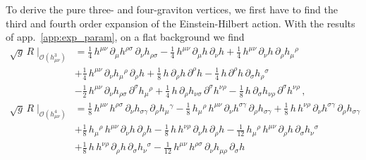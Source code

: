 \documentclass[11pt]{book}
\numberwithin{equation}{chapter}
\begin{document}
\begin{appendices}
To derive the pure three- and four-graviton vertices, we first have
to find the third and fourth order expansion of the Einstein-Hilbert
action. With the results of app.~\ref{app:exp_param},
on a flat background we find
\begin{align}
  \sqrt{g} \, R \; \Big|_{\mathcal O(h_{\mu\nu}^3)} &=
     \frac{1}{4} \, h^{\mu \nu} \, \partial_{\mu}    h^{\rho \sigma}  \, \partial_{\nu}    h_{\rho \sigma}
   - \frac{1}{4} \, h^{\mu \nu} \, \partial_{\mu}    h                \, \partial_{\nu}    h
   + \frac{1}{4} \, h^{\mu \nu} \, \partial_{\nu}    h                \, \partial_{\rho}   h_{\mu}{}^{\rho} \nonumber \\
  &+ \frac{1}{4} \, h^{\mu \nu} \, \partial_{\nu}    h_{\mu}{}^{\rho} \, \partial_{\rho}   h
   + \frac{1}{8} \, h           \, \partial_{\rho}   h                \, \partial^{\rho}   h
   - \frac{1}{4} \, h           \, \partial^{\rho}   h                \, \partial_{\sigma} h_{\rho}{}^{\sigma} \nonumber \\
  &- \frac{1}{2} \, h^{\mu \nu} \, \partial_{\nu}    h_{\rho \sigma}  \, \partial^{\sigma} h_{\mu}{}^{\rho}
   + \frac{1}{4} \, h           \, \partial_{\rho}   h_{\nu \sigma}   \, \partial^{\sigma} h^{\nu \rho}
   - \frac{1}{8} \, h           \, \partial_{\sigma} h_{\nu \rho}     \, \partial^{\sigma} h^{\nu \rho} \,, \\
   \sqrt{g} \, R \; \Big|_{\mathcal O(h_{\mu\nu}^4)} &=
     \frac{1}{8}  \, h^{\mu \nu}      \, h^{\rho \sigma} \, \partial_{\nu}    h_{\sigma \gamma}  \, \partial_{\rho}   h_{\mu}{}^{\gamma}
   - \frac{1}{8}  \, h_{\mu}{}^{\rho} \, h^{\mu \nu}     \, \partial_{\nu}    h^{\sigma \gamma}  \, \partial_{\rho}   h_{\sigma \gamma}
   + \frac{1}{8}  \, h                \, h^{\nu \rho}    \, \partial_{\nu}    h^{\sigma \gamma}  \, \partial_{\rho}   h_{\sigma \gamma} \nonumber \\
  &+ \frac{1}{8}  \, h_{\mu}{}^{\rho} \, h^{\mu \nu}     \, \partial_{\nu}    h                  \, \partial_{\rho}   h
   - \frac{1}{8}  \, h                \, h^{\nu \rho}    \, \partial_{\nu}    h                  \, \partial_{\rho}   h
   - \frac{1}{12} \, h_{\mu}{}^{\rho} \, h^{\mu \nu}     \, \partial_{\rho}   h                  \, \partial_{\sigma} h_{\nu}{}^{\sigma} \nonumber \\
  &+ \frac{1}{8}  \, h                \, h^{\nu \rho}    \, \partial_{\rho}   h                  \, \partial_{\sigma} h_{\nu}{}^{\sigma}
   - \frac{1}{12} \, h^{\mu \nu}      \, h^{\rho \sigma} \, \partial_{\nu}    h_{\mu \rho}       \, \partial_{\sigma} h

\end{align}
\end{appendices}
\end{document}
